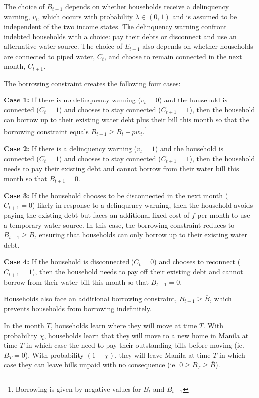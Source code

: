 \documentclass[12pt]{article}
\begin{document}
The choice of $B_{t+1}$ depends on whether households receive a delinquency warning, $v_t$, which occurs with probability $\lambda \in (0,1)$ and is assumed to be independent of the two income states.  The delinquency warning confront indebted households with a choice: pay their debts or disconnect and use an alternative water source.  The choice of $B_{t+1}$ also depends on whether households are connected to piped water, $C_t$, and choose to remain connected in the next month, $C_{t+1}$.  

The borrowing constraint creates the following four cases:

\textbf{Case 1:} If there is no delinquency warning ($v_t=0$) and the household is connected ($C_{t}=1$) and chooses to stay connected ($C_{t+1}=1$), then the household can borrow up to their existing water debt plus their bill this month so that the borrowing constraint equals $B_{t+1}\geq B_t -  p w_t $.\footnote{Borrowing is given by negative values for $B_t$ and $B_{t+1}$}

\textbf{Case 2:} If there is a delinquency warning ($v_t=1$) and the household is connected ($C_t=1$) and chooses to stay connected ($C_{t+1}=1$), then the household needs to pay their existing debt and cannot borrow from their water bill this month so that $B_{t+1} = 0$.

\textbf{Case 3:} If the household chooses to be disconnected in the next month ($C_{t+1}=0$) likely in response to a delinquency warning, then the household avoids paying the existing debt but faces an additional fixed cost of $f$ per month to use a temporary water source.  In this case, the borrowing constraint reduces to $ B_{t+1} \geq B_t$ ensuring that households can only borrow up to their existing water debt.  

\textbf{Case 4:} If the household is disconnected ($C_t=0$) and chooses to reconnect ($C_{t+1}=1$), then the household needs to pay off their existing debt and cannot borrow from their water bill this month so that $B_{t+1} = 0$.  

Households also face an additional borrowing constraint, $ B_{t+1} \geq \overline{B}$, which prevents households from borrowing indefinitely.  

In the month $\overline{T}$, households learn where they will move at time $T$. With probability $\chi$, households learn that they will move to a new home in Manila at time $T$ in which case the need to pay their outstanding bills before moving (ie. $B_T=0$).  With probability $(1-\chi)$, they will leave Manila at time $T$ in which case they can leave bills unpaid with no consequence (ie. $0\geq B_T \geq \overline{B}$).
\end{document}
